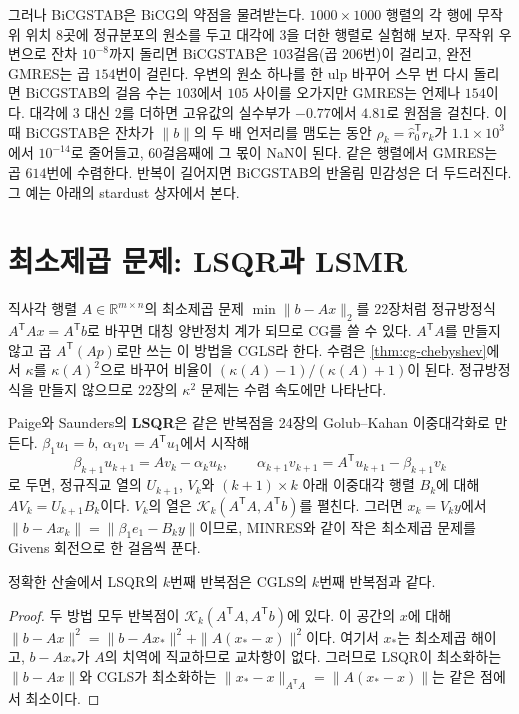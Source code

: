 그러나 BiCGSTAB은 BiCG의 약점을 물려받는다. $1000\times1000$ 행렬의 각 행에 무작위 위치 $8$곳에 정규분포의 원소를 두고 대각에 $3$을 더한 행렬로 실험해 보자. 무작위 우변으로 잔차 $10^{-8}$까지 돌리면 BiCGSTAB은 $103$걸음(곱 $206$번)이 걸리고, 완전 GMRES는 곱 $154$번이 걸린다. 우변의 원소 하나를 한 ulp 바꾸어 스무 번 다시 돌리면 BiCGSTAB의 걸음 수는 $103$에서 $105$ 사이를 오가지만 GMRES는 언제나 $154$이다. 대각에 $3$ 대신 $2$를 더하면 고유값의 실수부가 $-0.77$에서 $4.81$로 원점을 걸친다. 이때 BiCGSTAB은 잔차가 $\|b\|$의 두 배 언저리를 맴도는 동안 $\rho_k=\hat r_0^{\mathsf T}r_k$가 $1.1\times10^3$에서 $10^{-14}$로 줄어들고, $60$걸음째에 그 몫이 NaN이 된다. 같은 행렬에서 GMRES는 곱 $614$번에 수렴한다. 반복이 길어지면 BiCGSTAB의 반올림 민감성은 더 두드러진다. 그 예는 아래의 stardust 상자에서 본다.

\section{최소제곱 문제: LSQR과 LSMR}
\label{sec:lsqr}

직사각 행렬 $A\in\mathbb R^{m\times n}$의 최소제곱 문제 $\min\|b-Ax\|_2$를 22장처럼 정규방정식 $A^{\mathsf T}Ax=A^{\mathsf T}b$로 바꾸면 대칭 양반정치 계가 되므로 CG를 쓸 수 있다. $A^{\mathsf T}A$를 만들지 않고 곱 $A^{\mathsf T}(Ap)$로만 쓰는 이 방법을 CGLS라 한다. 수렴은 \cref{thm:cg-chebyshev}에서 $\kappa$를 $\kappa(A)^2$으로 바꾸어 비율이 $(\kappa(A)-1)/(\kappa(A)+1)$이 된다. 정규방정식을 만들지 않으므로 22장의 $\kappa^2$ 문제는 수렴 속도에만 나타난다.

Paige와 Saunders의 \textbf{LSQR}은 같은 반복점을 24장의 Golub--Kahan 이중대각화로 만든다\cite{paige1982lsqr,golub1965kahan}. $\beta_1u_1=b$, $\alpha_1v_1=A^{\mathsf T}u_1$에서 시작해
\[
\beta_{k+1}u_{k+1}=Av_k-\alpha_ku_k,\qquad\alpha_{k+1}v_{k+1}=A^{\mathsf T}u_{k+1}-\beta_{k+1}v_k
\]
로 두면, 정규직교 열의 $U_{k+1}$, $V_k$와 $(k+1)\times k$ 아래 이중대각 행렬 $B_k$에 대해 $AV_k=U_{k+1}B_k$이다. $V_k$의 열은 $\mathcal K_k(A^{\mathsf T}A,A^{\mathsf T}b)$를 펼친다. 그러면 $x_k=V_ky$에서 $\|b-Ax_k\|=\|\beta_1e_1-B_ky\|$이므로, MINRES와 같이 작은 최소제곱 문제를 Givens 회전으로 한 걸음씩 푼다.

\begin{proposition}
\label{prop:lsqr-cgls}
정확한 산술에서 LSQR의 $k$번째 반복점은 CGLS의 $k$번째 반복점과 같다.
\end{proposition}

\begin{proof}
두 방법 모두 반복점이 $\mathcal K_k(A^{\mathsf T}A,A^{\mathsf T}b)$에 있다. 이 공간의 $x$에 대해 $\|b-Ax\|^2=\|b-Ax_\ast\|^2+\|A(x_\ast-x)\|^2$이다. 여기서 $x_\ast$는 최소제곱 해이고, $b-Ax_\ast$가 $A$의 치역에 직교하므로 교차항이 없다. 그러므로 LSQR이 최소화하는 $\|b-Ax\|$와 CGLS가 최소화하는 $\|x_\ast-x\|_{A^{\mathsf T}A}=\|A(x_\ast-x)\|$는 같은 점에서 최소이다.
\end{proof}

